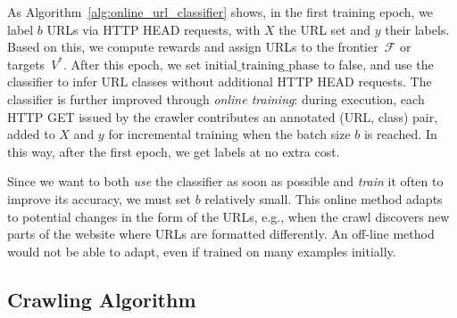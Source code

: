\begin{algorithm} [t!]
	\caption{Online URL classifier procedure}\label{alg:online_url_classifier}

\end{algorithm}

As Algorithm~\ref{alg:online_url_classifier} shows, in the first training epoch, we label $b$ URLs via HTTP HEAD requests, with $X$ the URL set and $y$ their labels. Based on this, we compute rewards and assign URLs to the frontier~$\mathcal{F}$ or targets~$V^*$.
After this epoch, we set $\textrm{initial\_training\_phase}$ to false, and use the classifier to infer URL classes without additional HTTP HEAD requests.
The classifier is further improved through \emph{online training}: during execution, each HTTP GET issued by the crawler contributes an annotated (URL, class) pair, added to $X$ and $y$ for incremental training when the batch size $b$ is reached. In this way, after the first epoch, we get labels at no extra cost.

Since we want to both \emph{use} the classifier as soon as possible and \emph{train} it often to improve its accuracy, we must set $b$ relatively small.
This online method adapts to potential changes in the form of the URLs, e.g.,  when the crawl discovers new parts of the website where URLs are formatted differently. An off-line method would not be able to adapt, even if trained on many examples initially.

\subsection{Crawling Algorithm}\label{subsection:crawling_algorithm}

